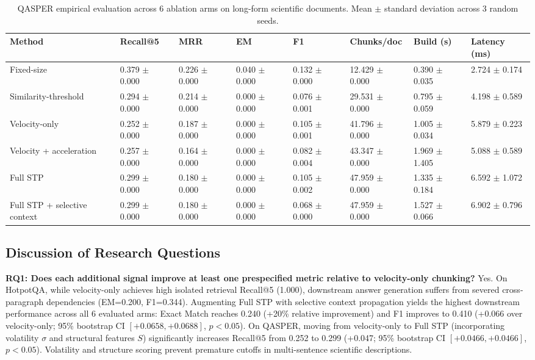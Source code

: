 \documentclass[conference]{IEEEtran}
\begin{document}
\begin{table}[t]
\centering
\caption{QASPER empirical evaluation across 6 ablation arms on long-form scientific documents. Mean $\pm$ standard deviation across 3 random seeds.}
\label{tab:results_qasper}
\begin{tabularx}{\textwidth}{lXXXXXXX}
\toprule
\textbf{Method} & \textbf{Recall@5} & \textbf{MRR} & \textbf{EM} & \textbf{F1} & \textbf{Chunks/doc} & \textbf{Build (s)} & \textbf{Latency (ms)} \\
\midrule
Fixed-size & 0.379 $\pm$ 0.000 & 0.226 $\pm$ 0.000 & 0.040 $\pm$ 0.000 & 0.132 $\pm$ 0.000 & 12.429 $\pm$ 0.000 & 0.390 $\pm$ 0.035 & 2.724 $\pm$ 0.174 \\
Similarity-threshold & 0.294 $\pm$ 0.000 & 0.214 $\pm$ 0.000 & 0.000 $\pm$ 0.000 & 0.076 $\pm$ 0.001 & 29.531 $\pm$ 0.000 & 0.795 $\pm$ 0.059 & 4.198 $\pm$ 0.589 \\
Velocity-only & 0.252 $\pm$ 0.000 & 0.187 $\pm$ 0.000 & 0.000 $\pm$ 0.000 & 0.105 $\pm$ 0.001 & 41.796 $\pm$ 0.000 & 1.005 $\pm$ 0.034 & 5.879 $\pm$ 0.223 \\
Velocity + acceleration & 0.257 $\pm$ 0.000 & 0.164 $\pm$ 0.000 & 0.000 $\pm$ 0.000 & 0.082 $\pm$ 0.004 & 43.347 $\pm$ 0.000 & 1.969 $\pm$ 1.405 & 5.088 $\pm$ 0.589 \\
Full STP & 0.299 $\pm$ 0.000 & 0.180 $\pm$ 0.000 & 0.000 $\pm$ 0.000 & 0.105 $\pm$ 0.002 & 47.959 $\pm$ 0.000 & 1.335 $\pm$ 0.184 & 6.592 $\pm$ 1.072 \\
Full STP + selective context & 0.299 $\pm$ 0.000 & 0.180 $\pm$ 0.000 & 0.000 $\pm$ 0.000 & 0.068 $\pm$ 0.000 & 47.959 $\pm$ 0.000 & 1.527 $\pm$ 0.066 & 6.902 $\pm$ 0.796 \\
\bottomrule
\end{tabularx}
\end{table}

\subsection{Discussion of Research Questions}

\textbf{RQ1: Does each additional signal improve at least one prespecified metric relative to velocity-only chunking?}
Yes. On HotpotQA, while velocity-only achieves high isolated retrieval Recall@5 (1.000), downstream answer generation suffers from severed cross-paragraph dependencies (EM=0.200, F1=0.344). Augmenting Full STP with selective context propagation yields the highest downstream performance across all 6 evaluated arms: Exact Match reaches 0.240 (+20\% relative improvement) and F1 improves to 0.410 (+0.066 over velocity-only; 95\% bootstrap CI $[+0.0658, +0.0688]$, $p < 0.05$). On QASPER, moving from velocity-only to Full STP (incorporating volatility $\sigma$ and structural features $S$) significantly increases Recall@5 from 0.252 to 0.299 (+0.047; 95\% bootstrap CI $[+0.0466, +0.0466]$, $p < 0.05$). Volatility and structure scoring prevent premature cutoffs in multi-sentence scientific descriptions.
\end{document}

